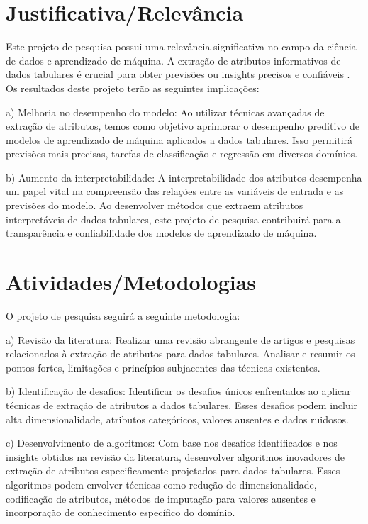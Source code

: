 \documentclass{article}
\begin{document}
\section{Justificativa/Relevância}

Este projeto de pesquisa possui uma relevância significativa no campo da ciência de dados e aprendizado de máquina. A extração de atributos informativos de dados tabulares é crucial para obter previsões ou insights precisos e confiáveis \cite{jain1997feature,jovic2015review,zebari2020comprehensive}. Os resultados deste projeto terão as seguintes implicações:

a) Melhoria no desempenho do modelo: Ao utilizar técnicas avançadas de extração de atributos, temos como objetivo aprimorar o desempenho preditivo de modelos de aprendizado de máquina aplicados a dados tabulares. Isso permitirá previsões mais precisas, tarefas de classificação e regressão em diversos domínios.

b) Aumento da interpretabilidade: A interpretabilidade dos atributos desempenha um papel vital na compreensão das relações entre as variáveis de entrada e as previsões do modelo. Ao desenvolver métodos que extraem atributos interpretáveis de dados tabulares, este projeto de pesquisa contribuirá para a transparência e confiabilidade dos modelos de aprendizado de máquina.

\section{Atividades/Metodologias}

O projeto de pesquisa seguirá a seguinte metodologia:

a) Revisão da literatura: Realizar uma revisão abrangente de artigos e pesquisas relacionados à extração de atributos para dados tabulares. Analisar e resumir os pontos fortes, limitações e princípios subjacentes das técnicas existentes.

b) Identificação de desafios: Identificar os desafios únicos enfrentados ao aplicar técnicas de extração de atributos a dados tabulares. Esses desafios podem incluir alta dimensionalidade, atributos categóricos, valores ausentes e dados ruidosos.

c) Desenvolvimento de algoritmos: Com base nos desafios identificados e nos insights obtidos na revisão da literatura, desenvolver algoritmos inovadores de extração de atributos especificamente projetados para dados tabulares. Esses algoritmos podem envolver técnicas como redução de dimensionalidade, codificação de atributos, métodos de imputação para valores ausentes e incorporação de conhecimento específico do domínio.
\end{document}
